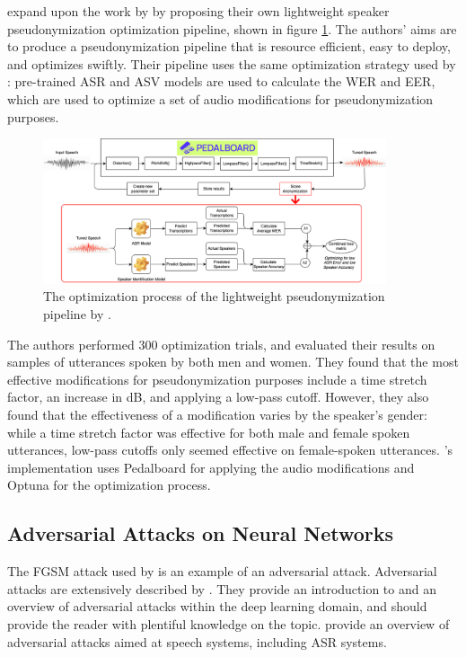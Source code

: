 \documentclass[11pt]{article}
\begin{document}
\citet{roddeman2024anonymization} expand upon the work by \citet{kai2022lightweight} by proposing their own lightweight speaker pseudonymization optimization pipeline, shown in figure \ref{fig:roddeman_etal_optimization}.
The authors' aims are to produce a pseudonymization pipeline that is resource efficient, easy to deploy, and optimizes swiftly.
Their pipeline uses the same optimization strategy used by \citeauthor{kai2022lightweight}: pre-trained ASR and ASV models are used to calculate the WER and EER, which are used to optimize a set of audio modifications for pseudonymization purposes.

\begin{figure}
  \centering
  \includegraphics[width=0.9\textwidth]{roddeman_etal_optimization.png}
  \caption{The optimization process of the lightweight pseudonymization pipeline by \citet{roddeman2024anonymization}.}
  \label{fig:roddeman_etal_optimization}
\end{figure}

The authors performed 300 optimization trials, and evaluated their results on samples of utterances spoken by both men and women.
They found that the most effective modifications for pseudonymization purposes include a time stretch factor, an increase in dB, and applying a low-pass cutoff.
However, they also found that the effectiveness of a modification varies by the speaker's gender: while a time stretch factor was effective for both male and female spoken utterances, low-pass cutoffs only seemed effective on female-spoken utterances.
\citeauthor{roddeman2024anonymization}'s implementation uses Pedalboard \citep{sobot2021pedalboard} for applying the audio modifications and Optuna \citep{akiba2019optuna} for the optimization process.

\subsection{Adversarial Attacks on Neural Networks}
The FGSM attack used by \citet{shihao2024adversarial} is an example of an adversarial attack.
Adversarial attacks are extensively described by \citet{xiaoyong2019adversarial}.
They provide an introduction to and an overview of adversarial attacks within the deep learning domain, and should provide the reader with plentiful knowledge on the topic.
\citet{chen2022survey} provide an overview of adversarial attacks aimed at speech systems, including ASR systems.
\end{document}
